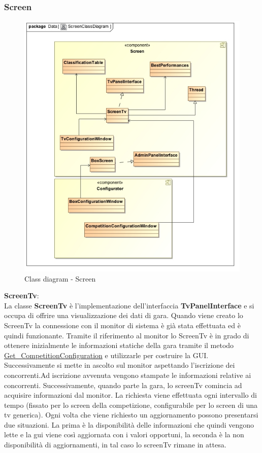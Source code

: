 \subsubsection{Screen}
\begin{center}
\begin{figure}[h!]
	\includegraphics[scale=0.50]{img/ClassDiagrams/ScreenClassDiagram.jpg}
\caption{Class diagram - Screen}
\end{figure}
\begin{description}
\item{\textbf{ScreenTv}}:\\
La classe \textbf{ScreenTv} \`{e} l'implementazione dell'interfaccia \textbf{TvPanelInterface} e si occupa di offrire una visualizzazione dei dati di gara.
Quando viene creato lo ScreenTv la connessione con il monitor di sistema \`{e} gi\`{a} stata effettuata ed \`{e} quindi funzionante. Tramite il riferimento al monitor lo ScreenTv \`{e} in grado di ottenere inizialmente le informazioni statiche della gara tramite il metodo \underline{Get\_CompetitionConfiguration} e utilizzarle per costruire la GUI. Successivamente si mette in ascolto sul monitor aspettando l'iscrizione dei concorrenti.Ad iscrizione avvenuta vengono stampate le informazioni relative ai concorrenti. Successivamente, quando parte la gara, lo screenTv comincia ad acquisire informazioni dal monitor. La richiesta viene effettuata ogni intervallo di tempo (fissato per lo screen della competizione, configurabile per lo screen di una tv generica). Ogni volta che viene richiesto un aggiornamento possono presentarsi due situazioni. La prima \`{e} la disponibilit\`{a} delle informazioni che quindi vengono lette e la gui viene cos\`{i} aggiornata con i valori opportuni, la seconda \`{e} la non disponibilit\`{a} di aggiornamenti, in tal caso lo screenTv rimane in attesa.
\end{description}
\end{center}
